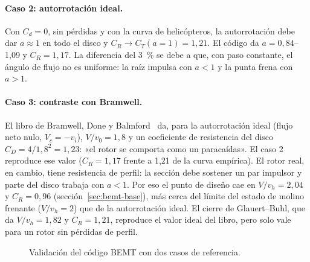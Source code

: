 \paragraph{Caso 2: autorrotación ideal.} Con $C_d=0$, sin pérdidas y con la curva de
helicópteros, la autorrotación debe dar $a\approx1$ en todo el disco y
$C_R\to C_T(a=1)=1{,}21$. El código da $a=0{,}84$--1,09 y $C_R=1{,}17$. La diferencia
del \SI{3}{\percent} se debe a que, con paso constante, el ángulo de flujo no es
uniforme: la raíz impulsa con $a<1$ y la punta frena con $a>1$.

\paragraph{Caso 3: contraste con Bramwell.} El libro de Bramwell, Done y
Balmford~\cite[\S2.3, ec.~2.17--2.18, fig.~2.8, p.~42--44]{bramwell2001} da, para la
autorrotación ideal (flujo neto nulo, $V_c=-v_i$), $V/v_0=1{,}8$ y un coeficiente de
resistencia del disco $C_D=4/1{,}8^2=1{,}23$: «el rotor se comporta como un paracaídas».
El caso 2 reproduce ese valor ($C_R=1{,}17$ frente a 1,21 de la curva empírica). El rotor
real, en cambio, tiene resistencia de perfil: la sección debe sostener un par
impulsor y parte del disco trabaja con $a<1$. Por eso el punto de diseño cae en
$V/v_h=2{,}04$ y $C_R=0{,}96$ (sección~\ref{sec:bemt-base}), más cerca del límite del
estado de molino frenante ($V/v_h=2$) que de la autorrotación ideal. El cierre de
Glauert--Buhl, que da $V/v_h=1{,}82$ y $C_R=1{,}21$, reproduce el valor ideal del libro,
pero solo vale para un rotor sin pérdidas de perfil.

\begin{figure}[H]
\centering
{}
\caption{Validación del código BEMT con dos casos de referencia.}
\label{fig:bemt-valid}
\end{figure}

